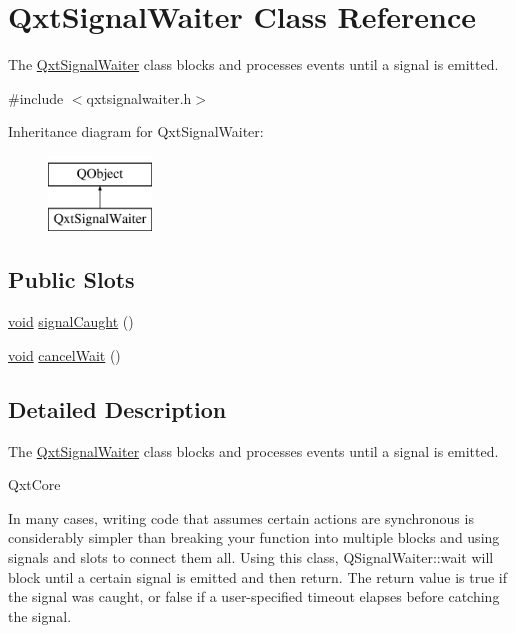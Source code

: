 \hypertarget{class_qxt_signal_waiter}{\section{Qxt\-Signal\-Waiter Class Reference}
\label{class_qxt_signal_waiter}
}


The \hyperlink{class_qxt_signal_waiter}{Qxt\-Signal\-Waiter} class blocks and processes events until a signal is emitted.  




{\ttfamily \#include $<$qxtsignalwaiter.\-h$>$}

Inheritance diagram for Qxt\-Signal\-Waiter\-:\begin{figure}[H]
\begin{center}
\leavevmode
\includegraphics[height=2.000000cm]{class_qxt_signal_waiter}
\end{center}
\end{figure}
\subsection*{Public Slots}
\begin{DoxyCompactItemize}
\item 
\hyperlink{group___u_a_v_objects_plugin_ga444cf2ff3f0ecbe028adce838d373f5c}{void} \hyperlink{class_qxt_signal_waiter_aa5f700c2e9911622eb61c1f4a085c32a}{signal\-Caught} ()
\item 
\hyperlink{group___u_a_v_objects_plugin_ga444cf2ff3f0ecbe028adce838d373f5c}{void} \hyperlink{class_qxt_signal_waiter_a05305b289fc5a73e289f53730d4fb187}{cancel\-Wait} ()
\end{DoxyCompactItemize}


\subsection{Detailed Description}
The \hyperlink{class_qxt_signal_waiter}{Qxt\-Signal\-Waiter} class blocks and processes events until a signal is emitted. 

Qxt\-Core

In many cases, writing code that assumes certain actions are synchronous is considerably simpler than breaking your function into multiple blocks and using signals and slots to connect them all. Using this class, Q\-Signal\-Waiter\-::wait will block until a certain signal is emitted and then return. The return value is true if the signal was caught, or false if a user-\/specified timeout elapses before catching the signal.


